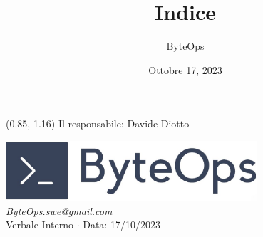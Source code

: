 \documentclass{article}
\title{\textbf{\fontsize{28}{6}\selectfont Indice}}
\author{\fontsize{14}{6}\selectfont ByteOps}
\date{Ottobre 17, 2023}
\begin{document}
\begin{textblock*}{\textwidth}(0.85\textwidth, 1.16\textheight)
    Il responsabile: Davide Diotto
\end{textblock*}

\pagestyle{fancy}
\begin{center}
\includegraphics[width = 0.7\textwidth]{../../Images/logo.png} \\
\vspace{0.2cm}
\textcolor[RGB]{60, 60, 60}{\textit{ByteOps.swe@gmail.com}} \\
\vspace{1cm}
\fontsize{16}{6}\selectfont Verbale Interno $\cdot$ Data: 17/10/2023 \\
\vspace{0.5cm}
\end{center}
\end{document}
